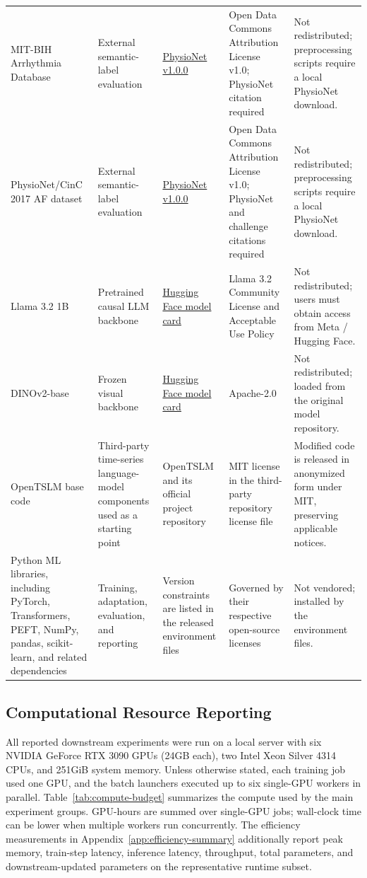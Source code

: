 \documentclass{article}
\begin{document}
\begin{longtable}{p{2.0cm}p{1.7cm}p{3.0cm}p{3.0cm}p{2.7cm}}
MIT-BIH Arrhythmia Database & External semantic-label evaluation & \href{https://physionet.org/content/mitdb/1.0.0/}{PhysioNet v1.0.0} & Open Data Commons Attribution License v1.0; PhysioNet citation required & Not redistributed; preprocessing scripts require a local PhysioNet download. \\
PhysioNet/CinC 2017 AF dataset & External semantic-label evaluation & \href{https://physionet.org/content/challenge-2017/1.0.0/}{PhysioNet v1.0.0} & Open Data Commons Attribution License v1.0; PhysioNet and challenge citations required & Not redistributed; preprocessing scripts require a local PhysioNet download. \\
Llama 3.2 1B & Pretrained causal LLM backbone & \href{https://huggingface.co/meta-llama/Llama-3.2-1B}{Hugging Face model card} & Llama 3.2 Community License and Acceptable Use Policy & Not redistributed; users must obtain access from Meta / Hugging Face. \\
DINOv2-base & Frozen visual backbone & \href{https://huggingface.co/facebook/dinov2-base}{Hugging Face model card} & Apache-2.0 & Not redistributed; loaded from the original model repository. \\
OpenTSLM base code & Third-party time-series language-model components used as a starting point & OpenTSLM \citep{langer2025opentslm} and its official project repository & MIT license in the third-party repository license file & Modified code is released in anonymized form under MIT, preserving applicable notices. \\
Python ML libraries, including PyTorch, Transformers, PEFT, NumPy, pandas, scikit-learn, and related dependencies & Training, adaptation, evaluation, and reporting & Version constraints are listed in the released environment files & Governed by their respective open-source licenses & Not vendored; installed by the environment files. \\
\end{longtable}
\endgroup

\subsection{Computational Resource Reporting}
\label{app:compute-budget}

All reported downstream experiments were run on a local server with six NVIDIA
GeForce RTX 3090 GPUs (24GB each), two Intel Xeon Silver 4314 CPUs, and 251GiB
system memory. Unless otherwise stated, each training job used one GPU, and the
batch launchers executed up to six single-GPU workers in parallel.
Table~\ref{tab:compute-budget} summarizes the compute used by the main
experiment groups. GPU-hours are summed over single-GPU jobs; wall-clock time
can be lower when multiple workers run concurrently. The efficiency measurements
in Appendix~\ref{app:efficiency-summary} additionally report peak memory,
train-step latency, inference latency, throughput, total parameters, and
downstream-updated parameters on the representative runtime subset.
\end{document}
